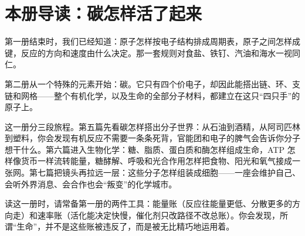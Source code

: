 \chapter*{本册导读：碳怎样活了起来}

第一册结束时，我们已经知道：原子怎样按电子结构排成周期表，原子之间怎样成键，反应的方向和速度由什么决定。那一套规则对食盐、铁钉、汽油和海水一视同仁。

第二册从一个特殊的元素开始：碳。它只有四个价电子，却因此能搭出链、环、支链和网格——整个有机化学，以及生命的全部分子材料，都建立在这只“四只手”的原子上。

这一册分三段旅程。第五篇先看碳怎样搭出分子世界：从石油到酒精，从阿司匹林到塑料，你会发现有机反应不需要一条条死背，官能团和电子的脾气会告诉你分子想干什么。第六篇进入生物化学：糖、脂质、蛋白质和酶怎样组成生命，ATP 怎样像货币一样流转能量，糖酵解、呼吸和光合作用怎样把食物、阳光和氧气接成一张网。第七篇把镜头再拉远一层：这些分子怎样组装成细胞——一座会维护自己、会听外界消息、会合作也会“叛变”的化学城市。

读这一册时，请常备第一册的两件工具：能量账（反应往能量更低、分散更多的方向走）和速率账（活化能决定快慢，催化剂只改路径不改总账）。你会发现，所谓“生命”，并不是这些账被违反了，而是被无比精巧地运用着。
